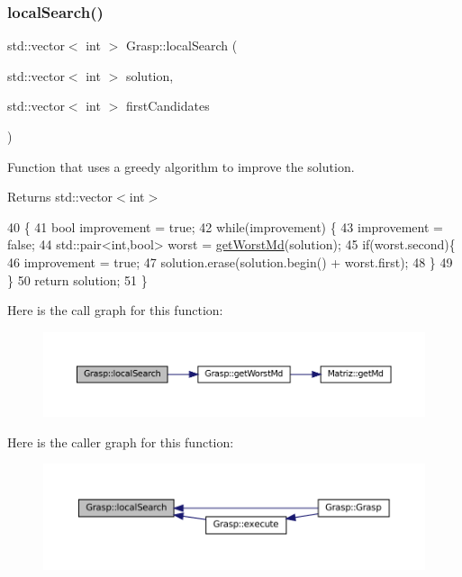 \subsubsection{\texorpdfstring{local\+Search()}{localSearch()}}
{\footnotesize\ttfamily std\+::vector$<$ int $>$ Grasp\+::local\+Search (\begin{DoxyParamCaption}\item[{std\+::vector$<$ int $>$}]{solution,  }\item[{std\+::vector$<$ int $>$}]{first\+Candidates }\end{DoxyParamCaption})}



Function that uses a greedy algorithm to improve the solution. 

\begin{DoxyReturn}{Returns}
std\+::vector$<$int$>$ 
\end{DoxyReturn}

\begin{DoxyCode}
40                                                                                          \{
41   \textcolor{keywordtype}{bool} improvement = \textcolor{keyword}{true};
42   \textcolor{keywordflow}{while}(improvement) \{
43     improvement = \textcolor{keyword}{false};
44     std::pair<int,bool> worst = \hyperlink{classGrasp_a858a5aee4066bf5ef7946e8ea3e10bcf}{getWorstMd}(solution);
45     \textcolor{keywordflow}{if}(worst.second)\{
46       improvement = \textcolor{keyword}{true};
47       solution.erase(solution.begin() + worst.first);
48     \}
49   \}
50   \textcolor{keywordflow}{return} solution;
51 \}
\end{DoxyCode}
Here is the call graph for this function\+:\nopagebreak
\begin{figure}[H]
\begin{center}
\leavevmode
\includegraphics[width=350pt]{classGrasp_a7c5bebb4a0dea342928f66fb73a56559_cgraph}
\end{center}
\end{figure}
Here is the caller graph for this function\+:\nopagebreak
\begin{figure}[H]
\begin{center}
\leavevmode
\includegraphics[width=350pt]{classGrasp_a7c5bebb4a0dea342928f66fb73a56559_icgraph}
\end{center}
\end{figure}
\mbox{\label{classGrasp_ac63d4a1892472663549c77686edfed74}} 
